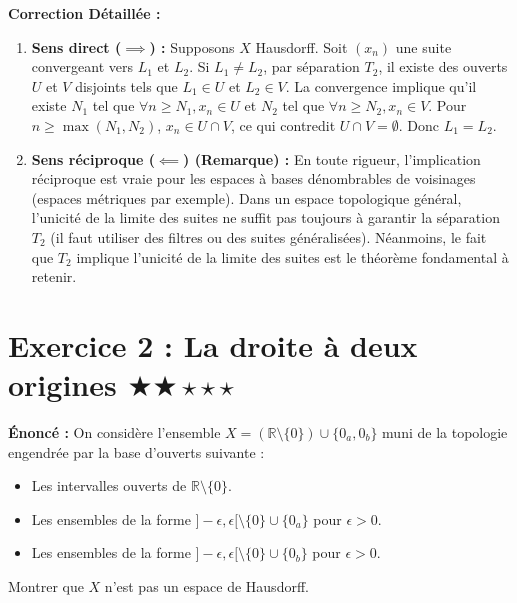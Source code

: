 \documentclass[11pt,a4paper]{article}
\begin{document}
\textbf{Correction Détaillée :}
\begin{enumerate}
\item \textbf{Sens direct ($\implies$) :} Supposons $X$ Hausdorff. Soit $(x_n)$ une suite convergeant vers $L_1$ et $L_2$. Si $L_1 \neq L_2$, par séparation $T_2$, il existe des ouverts $U$ et $V$ disjoints tels que $L_1 \in U$ et $L_2 \in V$. La convergence implique qu'il existe $N_1$ tel que $\forall n \ge N_1, x_n \in U$ et $N_2$ tel que $\forall n \ge N_2, x_n \in V$. Pour $n \ge \max(N_1, N_2)$, $x_n \in U \cap V$, ce qui contredit $U \cap V = \emptyset$. Donc $L_1 = L_2$.

\item \textbf{Sens réciproque ($\impliedby$) (Remarque) :} En toute rigueur, l'implication réciproque est vraie pour les espaces à bases dénombrables de voisinages (espaces métriques par exemple). Dans un espace topologique général, l'unicité de la limite des suites ne suffit pas toujours à garantir la séparation $T_2$ (il faut utiliser des filtres ou des suites généralisées). Néanmoins, le fait que $T_2$ implique l'unicité de la limite des suites est le théorème fondamental à retenir.
\end{enumerate}





\section{Exercice 2 : La droite à deux origines \quad $\bigstar\bigstar\star\star\star$}


\textbf{Énoncé :}
On considère l'ensemble $X = (\mathbb{R} \setminus \{0\}) \cup \{0_a, 0_b\}$ muni de la topologie engendrée par la base d'ouverts suivante :
\begin{itemize}
\item Les intervalles ouverts de $\mathbb{R} \setminus \{0\}$.

\item Les ensembles de la forme $]-\epsilon, \epsilon[ \setminus \{0\} \cup \{0_a\}$ pour $\epsilon > 0$.

\item Les ensembles de la forme $]-\epsilon, \epsilon[ \setminus \{0\} \cup \{0_b\}$ pour $\epsilon > 0$.
\end{itemize}
Montrer que $X$ n'est pas un espace de Hausdorff.
\end{document}
